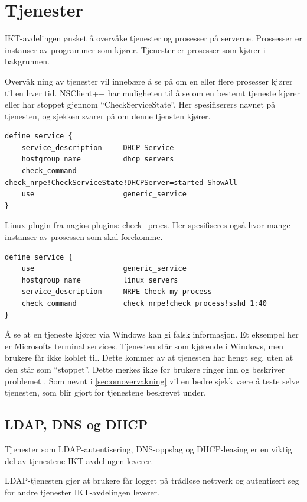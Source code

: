 \section{Tjenester}
IKT-avdelingen ønsket å overvåke tjenester og prosesser på serverne. Prossesser er instanser av programmer som kjører. Tjenester er prosesser som kjører i bakgrunnen. 

Overvåk	ning av tjenester vil innebære å se på om en eller flere prosesser kjører til en hver tid. NSClient++ har muligheten til å se om en bestemt tjeneste kjører eller har stoppet gjennom ``CheckServiceState''. Her spesifiserers navnet på tjenesten, og sjekken svarer på om denne tjensten kjører.
\begin{lstlisting}[style=example]
define service {
    service_description     DHCP Service
    hostgroup_name          dhcp_servers
    check_command           check_nrpe!CheckServiceState!DHCPServer=started ShowAll
    use                     generic_service
}
\end{lstlisting}
Linux-plugin fra nagios-plugins: check\_procs. Her spesifiseres også hvor mange instanser av prosessen som skal forekomme. 
\begin{lstlisting}[style=example]
define service {
    use            	        generic_service
    hostgroup_name       	linux_servers
    service_description     NRPE Check my process
    check_command        	check_nrpe!check_process!sshd 1:40
}
\end{lstlisting}

Å se at en tjeneste kjører via Windows kan gi falsk informasjon. Et eksempel her er Microsofts terminal services. Tjenesten står som kjørende i Windows, men brukere får ikke koblet til. Dette kommer av at tjenesten har hengt seg, uten at den står som ``stoppet''. Dette merkes ikke før brukere ringer inn og beskriver problemet \cite{serviceproblem}. Som nevnt i \ref{sec:omovervakning} vil en bedre sjekk være å teste selve tjenesten, som blir gjort for tjenestene beskrevet under.

\subsection{LDAP, DNS og DHCP}
Tjenester som LDAP-autentisering, DNS-oppslag og DHCP-leasing er en viktig del av tjenestene IKT-avdelingen leverer.

LDAP-tjenesten 	\cite{ldap} gjør at brukere får logget på trådløse nettverk og autentisert seg for andre tjenester IKT-avdelingen leverer.

